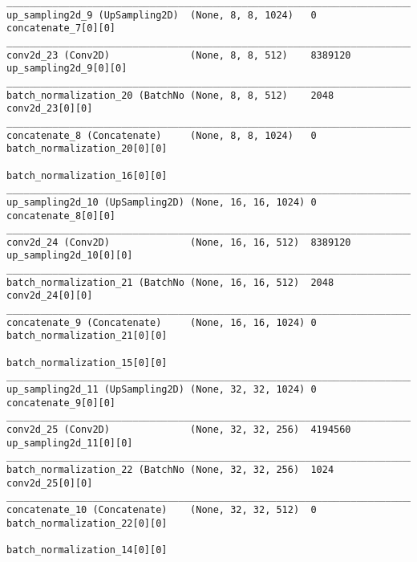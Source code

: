 \begin{verbatim}
__________________________________________________________________________________________________
up_sampling2d_9 (UpSampling2D)  (None, 8, 8, 1024)   0           concatenate_7[0][0]              
__________________________________________________________________________________________________
conv2d_23 (Conv2D)              (None, 8, 8, 512)    8389120     up_sampling2d_9[0][0]            
__________________________________________________________________________________________________
batch_normalization_20 (BatchNo (None, 8, 8, 512)    2048        conv2d_23[0][0]                  
__________________________________________________________________________________________________
concatenate_8 (Concatenate)     (None, 8, 8, 1024)   0           batch_normalization_20[0][0]     
                                                                 batch_normalization_16[0][0]     
__________________________________________________________________________________________________
up_sampling2d_10 (UpSampling2D) (None, 16, 16, 1024) 0           concatenate_8[0][0]              
__________________________________________________________________________________________________
conv2d_24 (Conv2D)              (None, 16, 16, 512)  8389120     up_sampling2d_10[0][0]           
__________________________________________________________________________________________________
batch_normalization_21 (BatchNo (None, 16, 16, 512)  2048        conv2d_24[0][0]                  
__________________________________________________________________________________________________
concatenate_9 (Concatenate)     (None, 16, 16, 1024) 0           batch_normalization_21[0][0]     
                                                                 batch_normalization_15[0][0]     
__________________________________________________________________________________________________
up_sampling2d_11 (UpSampling2D) (None, 32, 32, 1024) 0           concatenate_9[0][0]              
__________________________________________________________________________________________________
conv2d_25 (Conv2D)              (None, 32, 32, 256)  4194560     up_sampling2d_11[0][0]           
__________________________________________________________________________________________________
batch_normalization_22 (BatchNo (None, 32, 32, 256)  1024        conv2d_25[0][0]                  
__________________________________________________________________________________________________
concatenate_10 (Concatenate)    (None, 32, 32, 512)  0           batch_normalization_22[0][0]     
                                                                 batch_normalization_14[0][0]     

\end{verbatim}
